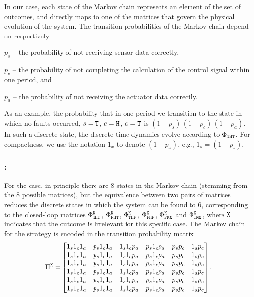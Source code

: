 In our case, each state of the Markov chain represents an element of the set of outcomes, and directly maps to one of the matrices that govern the physical evolution of the system.
The transition probabilities of the Markov chain depend on respectively
\begin{enumerate*}[label=(\roman*)]
    \item $p_s$ -- the probability of not receiving sensor data correctly,
    \item $p_c$ -- the probability of not completing the calculation of the control signal within one period, and
    \item $p_a$ -- the probability of not receiving the actuator data correctly.
\end{enumerate*}
As an example, the probability that in one period we transition to the state in which no faults occurred, $s=\texttt{T}$, $c=\texttt{H}$, $a=\texttt{T}$ is $(1-p_s)\,(1-p_c)\,(1-p_a)$.
In such a discrete state, the discrete-time dynamics evolve according to $\Phi_{\texttt{T}\texttt{H}\texttt{T}}$.
For compactness, we use the notation $1_x$ to denote $(1-p_x)$, e.g., $1_s = (1-p_s)$.

\subsubsection*{\tK{}:}
For the \tK{} case, in principle there are $8$ states in the Markov chain (stemming from the $8$ possible matrices), but the equivalence between two pairs of matrices reduces the discrete states in which the system can be found to $6$, corresponding to the closed-loop matrices $\Phi^{\texttt{K}}_{\texttt{T}\texttt{H}\texttt{T}}$, $\Phi^{\texttt{K}}_{\texttt{F}\texttt{H}\texttt{T}}$, $\Phi^{\texttt{K}}_{\texttt{T}\texttt{H}\texttt{F}}$, $\Phi^{\texttt{K}}_{\texttt{F}\texttt{H}\texttt{F}}$, $\Phi^{\texttt{K}}_{\texttt{F}\texttt{M}\texttt{X}}$ and $\Phi^{\texttt{K}}_{\texttt{T}\texttt{M}\texttt{X}}$, where $\texttt{X}$ indicates that the outcome is irrelevant for this specific case.
The Markov chain for the \tK{} strategy is encoded in the transition probability matrix
\begin{equation}
\label{eq:pikill}
\Pi^{\Kill} = \begin{bmatrix}
        1_s1_c1_a & p_s1_c1_a & 1_s1_cp_a & p_s1_cp_a & p_sp_c & 1_sp_c \\
        1_s1_c1_a & p_s1_c1_a & 1_s1_cp_a & p_s1_cp_a & p_sp_c & 1_sp_c \\
        1_s1_c1_a & p_s1_c1_a & 1_s1_cp_a & p_s1_cp_a & p_sp_c & 1_sp_c \\
        1_s1_c1_a & p_s1_c1_a & 1_s1_cp_a & p_s1_cp_a & p_sp_c & 1_sp_c \\
        1_s1_c1_a & p_s1_c1_a & 1_s1_cp_a & p_s1_cp_a & p_sp_c & 1_sp_c \\
        1_s1_c1_a & p_s1_c1_a & 1_s1_cp_a & p_s1_cp_a & p_sp_c & 1_sp_c \\
\end{bmatrix}.
\end{equation}


